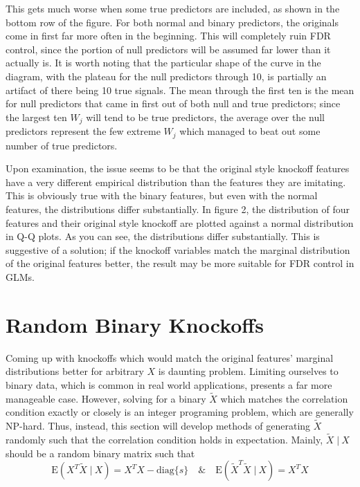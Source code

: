 \documentclass[11pt]{article}
\newcommand{\E}{\mathrm{E}}
\newcommand{\diag}[1]{\mathrm{diag}\{#1\}}
\newcommand{\st}{ \; \big | \:}
\theoremstyle{definition}
\begin{document}
    This gets much worse when some true predictors are included, as shown in the bottom row of the figure. For both normal and binary predictors, the originals come in first far more often in the beginning. This will completely ruin FDR control, since the portion of null predictors will be assumed far lower than it actually is. It is worth noting that the particular shape of the curve in the diagram, with the plateau for the null predictors through 10, is partially an artifact of there being 10 true signals. The mean through the first ten is the mean for null predictors that came in first out of both null and true predictors; since the largest ten $W_j$ will tend to be true predictors, the average over the null predictors represent the few extreme $W_j$ which managed to beat out some number of true predictors.  \par
    Upon examination, the issue seems to be that the original style knockoff features have a very different empirical distribution than the features they are imitating. This is obviously true with the binary features, but even with the normal features, the distributions differ substantially. In figure 2, the distribution of four features and their original style knockoff are plotted against a normal distribution in Q-Q plots. As you can see, the distributions differ substantially. This is suggestive of a solution; if the knockoff variables match the marginal distribution of the original features better, the result may be more suitable for FDR control in GLMs. \par
    \FloatBarrier

\section{Random Binary Knockoffs}
Coming up with knockoffs which would match the original features' marginal distributions better for arbitrary $X$ is daunting problem. Limiting ourselves to binary data, which is common in real world applications, presents a far more manageable case. However, solving for a binary $\tilde X$ which matches the correlation condition exactly or closely is an integer programing problem, which are generally NP-hard. Thus, instead, this section will develop methods of generating $\tilde X$ randomly such that the correlation condition holds in expectation. Mainly, $\tilde X\st X$ should be a random binary matrix such that
        \[ \E(X^T \tilde X \st X) = X^TX - \diag{s} \quad \& \quad \E(\tilde X^T \tilde X \st X) = X^TX\]
\end{document}
